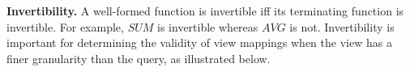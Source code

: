 
\textbf{Invertibility.} 
A well-formed function is invertible iff its terminating function is invertible.  For example, $SUM$ is invertible whereas $AVG$ is not. Invertibility is important for determining the validity of view mappings when the view has a finer granularity than the query, as illustrated below.

